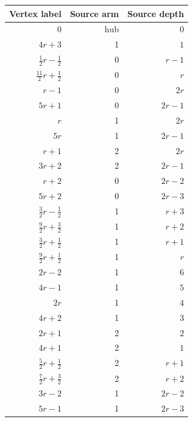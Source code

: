 \begin{longtable}{rrr}
Vertex label & Source arm & Source depth\\\hline\endhead
$0$ & $\mathrm{hub}$ & $0$\\
$4r+3$ & 1 & $1$\\
$\frac{1}{2}r-\frac{1}{2}$ & 0 & $r-1$\\
$\frac{11}{2}r+\frac{1}{2}$ & 0 & $r$\\
$r-1$ & 0 & $2r$\\
$5r+1$ & 0 & $2r-1$\\
$r$ & 1 & $2r$\\
$5r$ & 1 & $2r-1$\\
$r+1$ & 2 & $2r$\\
$3r+2$ & 2 & $2r-1$\\
$r+2$ & 0 & $2r-2$\\
$5r+2$ & 0 & $2r-3$\\
$\frac{3}{2}r-\frac{1}{2}$ & 1 & $r+3$\\
$\frac{9}{2}r+\frac{3}{2}$ & 1 & $r+2$\\
$\frac{3}{2}r+\frac{1}{2}$ & 1 & $r+1$\\
$\frac{9}{2}r+\frac{1}{2}$ & 1 & $r$\\
$2r-2$ & 1 & $6$\\
$4r-1$ & 1 & $5$\\
$2r$ & 1 & $4$\\
$4r+2$ & 1 & $3$\\
$2r+1$ & 2 & $2$\\
$4r+1$ & 2 & $1$\\
$\frac{5}{2}r+\frac{1}{2}$ & 2 & $r+1$\\
$\frac{7}{2}r+\frac{3}{2}$ & 2 & $r+2$\\
$3r-2$ & 1 & $2r-2$\\
$5r-1$ & 1 & $2r-3$\\
\end{longtable}
\endgroup

